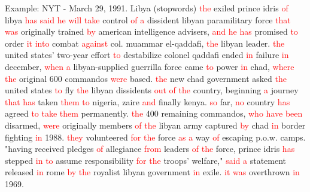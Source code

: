 \documentclass[english]{beamer}
\begin{document}
\begin{frame}
{\normalsize{Example: NYT - March 29, 1991. Libya (stopwords)}}
\textcolor{red}{the} exiled prince idris \textcolor{red}{of} libya %
\textcolor{red}{has} \textcolor{red}{said} \textcolor{red}{he} %
\textcolor{red}{will} \textcolor{red}{take} control \textcolor{red}{of} %
\textcolor{red}{a} dissident libyan paramilitary force \textcolor{red}{that} %
\textcolor{red}{was} originally trained \textcolor{red}{by} american
intelligence advisers, \textcolor{red}{and} \textcolor{red}{he} %
\textcolor{red}{has} promised \textcolor{red}{to} order \textcolor{red}{it} %
\textcolor{red}{into} combat \textcolor{red}{against} col. muammar
el-qaddafi, \textcolor{red}{the} libyan leader. \textcolor{red}{the} united
states' two-year effort \textcolor{red}{to} destabilize colonel qaddafi
ended \textcolor{red}{in} failure \textcolor{red}{in} december, %
\textcolor{red}{when} \textcolor{red}{a} libyan-supplied guerrilla force
came \textcolor{red}{to} power \textcolor{red}{in} chad, %
\textcolor{red}{where} \textcolor{red}{the} original 600 commandos %
\textcolor{red}{were} based. \textcolor{red}{the} new chad government asked %
\textcolor{red}{the} united states \textcolor{red}{to} fly %
\textcolor{red}{the} libyan dissidents \textcolor{red}{out} %
\textcolor{red}{of} \textcolor{red}{the} country, beginning %
\textcolor{red}{a} journey \textcolor{red}{that} \textcolor{red}{has} taken %
\textcolor{red}{them} \textcolor{red}{to} nigeria, zaire \textcolor{red}{and}
finally kenya. \textcolor{red}{so} far, \textcolor{red}{no} country %
\textcolor{red}{has} agreed \textcolor{red}{to} \textcolor{red}{take} %
\textcolor{red}{them} permanently. \textcolor{red}{the} 400 remaining
commandos, \textcolor{red}{who} \textcolor{red}{have} \textcolor{red}{been}
disarmed, \textcolor{red}{were} originally members \textcolor{red}{of} %
\textcolor{red}{the} libyan army captured \textcolor{red}{by} chad %
\textcolor{red}{in} border fighting \textcolor{red}{in} 1988. %
\textcolor{red}{they} volunteered \textcolor{red}{for} \textcolor{red}{the}
force \textcolor{red}{as} \textcolor{red}{a} way \textcolor{red}{of}
escaping p.o.w. camps. "having received pledges \textcolor{red}{of}
allegiance \textcolor{red}{from} leaders \textcolor{red}{of} %
\textcolor{red}{the} force, prince idris \textcolor{red}{has} stepped %
\textcolor{red}{in} \textcolor{red}{to} assume responsibility %
\textcolor{red}{for} \textcolor{red}{the} troops' welfare," %
\textcolor{red}{said} \textcolor{red}{a} statement released %
\textcolor{red}{in} rome \textcolor{red}{by} \textcolor{red}{the} royalist
libyan government \textcolor{red}{in} exile. \textcolor{red}{it} %
\textcolor{red}{was} overthrown \textcolor{red}{in} 1969.
\end{frame}
\end{document}
